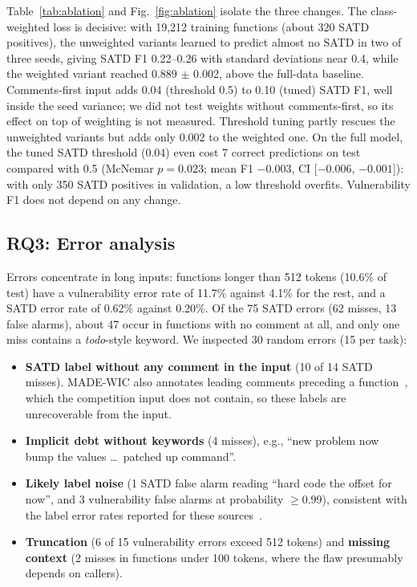 \documentclass[conference]{IEEEtran}
\begin{document}
Table~\ref{tab:ablation} and Fig.~\ref{fig:ablation} isolate the three changes. The class-weighted loss is decisive: with 19,212 training functions (about 320 SATD positives), the unweighted variants learned to predict almost no SATD in two of three seeds, giving SATD F1 0.22--0.26 with standard deviations near 0.4, while the weighted variant reached 0.889 $\pm$ 0.002, above the full-data baseline. Comments-first input adds 0.04 (threshold 0.5) to 0.10 (tuned) SATD F1, well inside the seed variance; we did not test weights without comments-first, so its effect on top of weighting is not measured. Threshold tuning partly rescues the unweighted variants but adds only 0.002 to the weighted one. On the full model, the tuned SATD threshold (0.04) even cost 7 correct predictions on test compared with 0.5 (McNemar $p=0.023$; mean F1 $-0.003$, CI [$-0.006$, $-0.001$]): with only 350 SATD positives in validation, a low threshold overfits. Vulnerability F1 does not depend on any change.

\subsection{RQ3: Error analysis}
Errors concentrate in long inputs: functions longer than 512 tokens (10.6\% of test) have a vulnerability error rate of 11.7\% against 4.1\% for the rest, and a SATD error rate of 0.62\% against 0.20\%. Of the 75 SATD errors (62 misses, 13 false alarms), about 47 occur in functions with no comment at all, and only one miss contains a \emph{todo}-style keyword. We inspected 30 random errors (15 per task):

\begin{itemize}
\item \textbf{SATD label without any comment in the input} (10 of 14 SATD misses). MADE-WIC also annotates leading comments preceding a function~\cite{madewic}, which the competition input does not contain, so these labels are unrecoverable from the input.
\item \textbf{Implicit debt without keywords} (4 misses), e.g., ``new problem now bump the values \dots\ patched up command''.
\item \textbf{Likely label noise} (1 SATD false alarm reading ``hard code the offset for now'', and 3 vulnerability false alarms at probability $\geq$0.99), consistent with the label error rates reported for these sources~\cite{croft2023}.
\item \textbf{Truncation} (6 of 15 vulnerability errors exceed 512 tokens) and \textbf{missing context} (2 misses in functions under 100 tokens, where the flaw presumably depends on callers).
\end{itemize}
\end{document}
